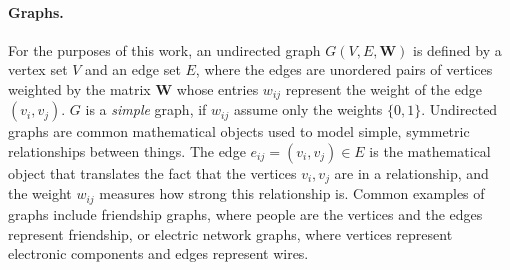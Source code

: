 \paragraph{Graphs.}
For the purposes of this work, an undirected graph $G(V, E, \mathbf W)$ is defined by a vertex set $V$ and an edge set $E$, where the edges are unordered pairs of vertices weighted by the matrix $\mathbf W$ whose entries $w_{ij}$ represent the weight of the edge $(v_i, v_j)$. $G$ is a \textit{simple} graph, if $w_{ij}$ assume only the weights $\{0, 1\}$. Undirected graphs are common mathematical objects used to model simple, symmetric relationships between things. The edge $e_{ij} = (v_i, v_j) \in E$ is the mathematical object that translates the fact that the vertices $v_i, v_j$ are in a relationship, and the weight $w_{ij}$ measures how strong this relationship is. Common examples of graphs include friendship graphs, where people are the vertices and the edges represent friendship, or electric network graphs, where vertices represent electronic components and edges represent wires.
